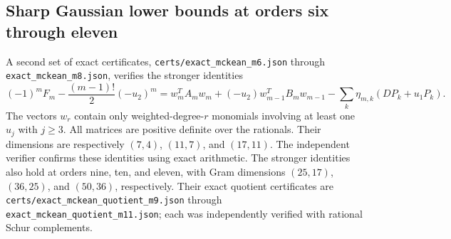 \subsection{Sharp Gaussian lower bounds at orders six through eleven}
A second set of exact certificates, \texttt{certs/exact\_mckean\_m6.json}
through \texttt{exact\_mckean\_m8.json}, verifies the stronger identities
\[
 (-1)^mF_m-\frac{(m-1)!}{2}(-u_2)^m
 =w_m^TA_mw_m+(-u_2)w_{m-1}^TB_mw_{m-1}
 -\sum_k\eta_{m,k}(DP_k+u_1P_k).
\]
The vectors $w_r$ contain only weighted-degree-$r$ monomials involving at
least one $u_j$ with $j\ge3$. All matrices are positive definite over the
rationals. Their dimensions are respectively $(7,4)$, $(11,7)$, and $(17,11)$.
The independent verifier confirms these identities using exact arithmetic.
The stronger identities also hold at orders nine, ten, and eleven, with Gram
dimensions $(25,17)$, $(36,25)$, and $(50,36)$, respectively. Their exact
quotient certificates are \texttt{certs/exact\_mckean\_quotient\_m9.json}
through \texttt{exact\_mckean\_quotient\_m11.json}; each was independently
verified with rational Schur complements.

